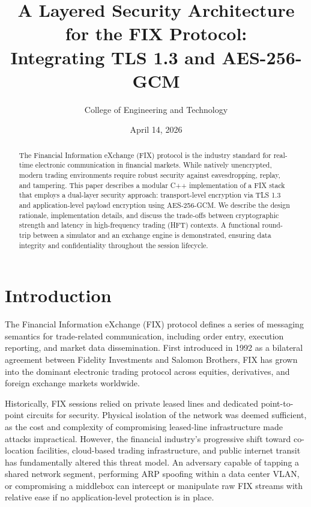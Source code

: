 \documentclass[twocolumn,10pt]{article}
\title{A Layered Security Architecture for the FIX Protocol: \\ Integrating TLS 1.3 and AES-256-GCM}
\author{College of Engineering and Technology}
\date{April 14, 2026}
\begin{document}
\maketitle

\begin{abstract}
The Financial Information eXchange (FIX) protocol is the industry standard
for real-time electronic communication in financial markets. While natively
unencrypted, modern trading environments require robust security against
eavesdropping, replay, and tampering. This paper describes a modular C++
implementation of a FIX stack that employs a dual-layer security approach:
transport-level encryption via TLS 1.3 and application-level payload
encryption using AES-256-GCM. We describe the design rationale, implementation
details, and discuss the trade-offs between cryptographic strength and latency
in high-frequency trading (HFT) contexts. A functional round-trip between a
simulator and an exchange engine is demonstrated, ensuring data integrity and
confidentiality throughout the session lifecycle.
\end{abstract}

\section{Introduction}

The Financial Information eXchange (FIX) protocol \cite{fix42} defines a
series of messaging semantics for trade-related communication, including order
entry, execution reporting, and market data dissemination. First introduced in
1992 as a bilateral agreement between Fidelity Investments and Salomon
Brothers, FIX has grown into the dominant electronic trading protocol across
equities, derivatives, and foreign exchange markets worldwide.

Historically, FIX sessions relied on private leased lines and dedicated point-to-point
circuits for security. Physical isolation of the network was deemed sufficient,
as the cost and complexity of compromising leased-line infrastructure made
attacks impractical. However, the financial industry's progressive shift
toward co-location facilities, cloud-based trading infrastructure, and public
internet transit has fundamentally altered this threat model. An adversary
capable of tapping a shared network segment, performing ARP spoofing within a
data center VLAN, or compromising a middlebox can intercept or manipulate raw
FIX streams with relative ease if no application-level protection is in place.
\end{document}
